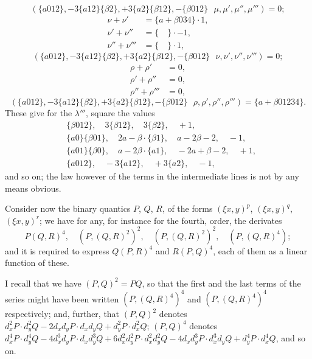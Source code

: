 \documentclass[12pt,a4paper]{article}
\theoremstyle{cayley}
\theoremstyle{definition}
\numberwithin{equation}{section}
\begin{document}
\[
(\{a012\}, -3\{a12\}\{\beta2\}, +3\{a2\}\{\beta12\}, -\{\beta012\} \,\,\,\, \mu, \mu', \mu'', \mu''') = 0;
\]
\begin{align*}
\nu + \nu' &= \{a + \beta 034\} \cdot 1, \\
\nu' + \nu'' &= \{ \quad \} \cdot -1, \\
\nu'' + \nu''' &= \{ \quad \} \cdot 1,
\end{align*}
\[
(\{a012\}, -3\{a12\}\{\beta2\}, +3\{a2\}\{\beta12\}, -\{\beta012\} \,\,\,\, \nu, \nu', \nu'', \nu''') = 0;
\]
\begin{align*}
\rho + \rho' &= 0, \\
\rho' + \rho'' &= 0, \\
\rho'' + \rho''' &= 0,
\end{align*}
\[
(\{a012\}, -3\{a12\}\{\beta2\}, +3\{a2\}\{\beta12\}, -\{\beta012\} \,\,\,\, \rho, \rho', \rho'', \rho''') = \{a + \beta 01234\}.
\]
These give for the $\lambda'''$, square the values
\begin{align*}
&\{\beta 012\}, \quad 3\{\beta 12\}, \quad 3\{\beta 2\}, \quad +1, \\
&\{a0\}\{\beta 01\}, \quad 2a - \beta \cdot \{\beta 1\}, \quad a - 2\beta - 2, \quad -1, \\
&\{a01\}\{\beta 0\}, \quad a - 2\beta \cdot \{a1\}, \quad -2a + \beta - 2, \quad +1, \\
&\{a012\}, \quad -3\{a12\}, \quad +3\{a2\}, \quad -1,
\end{align*}
and so on; the law however of the terms in the intermediate lines is not by any means obvious.

Consider now the binary quantics $P$, $Q$, $R$, of the forms $(\xi x, y)^p$, $(\xi x, y)^q$, $(\xi x, y)^r$; we have for any, for instance for the fourth, order, the derivates
\[
P(Q, R)^4, \quad (P, (Q, R)^2)^2, \quad (P, (Q, R)^2)^2, \quad (P, (Q, R)^4);
\]
and it is required to express $Q(P, R)^4$ and $R(P, Q)^4$, each of them as a linear function of these.

I recall that we have $(P, Q)^2 = PQ$, so that the first and the last terms of the series might have been written $(P, (Q, R)^4)^4$ and $(P, (Q, R)^4)^4$ respectively; and, further, that $(P, Q)^2$ denotes $d_x^2 P \cdot d_y^2 Q - 2d_x d_y P \cdot d_x d_y Q + d_y^2 P \cdot d_x^2 Q$; $(P, Q)^4$ denotes $d_x^4 P \cdot d_y^4 Q - 4d_x^3 d_y P \cdot d_x d_y^3 Q + 6d_x^2 d_y^2 P \cdot d_x^2 d_y^2 Q - 4d_x d_y^3 P \cdot d_x^3 d_y Q + d_y^4 P \cdot d_x^4 Q$, and so on.
\end{document}
